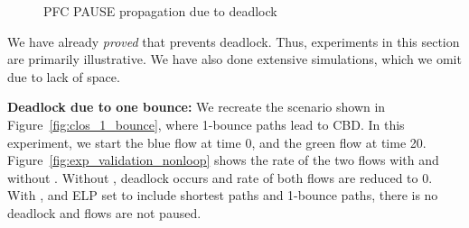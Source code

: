 \begin{figure}[t]
	\centering
	

	\vspace{-0.5em}
	\caption{PFC PAUSE propagation due to deadlock
	 }\label{fig:exp_validation_propagation}
	\vspace{-0.5em}
\end{figure}


We have already {\em proved} that \sysname{} prevents deadlock. Thus,
experiments in this section are primarily illustrative. We have also done
extensive simulations, which we omit due to lack of space.

\textbf{Deadlock due to one bounce:} We recreate the scenario shown in
Figure~\ref{fig:clos_1_bounce}, where 1-bounce paths lead to CBD.  In this
experiment, we start the blue flow at time 0, and the green flow at time 20.
Figure~\ref{fig:exp_validation_nonloop} shows the rate of the two flows with and
without \sysname{}.  Without \sysname{}, deadlock occurs and rate of both flows
are reduced to 0. With \sysname{}, and ELP set to include shortest paths and
1-bounce paths, there is no deadlock and flows are not paused.

